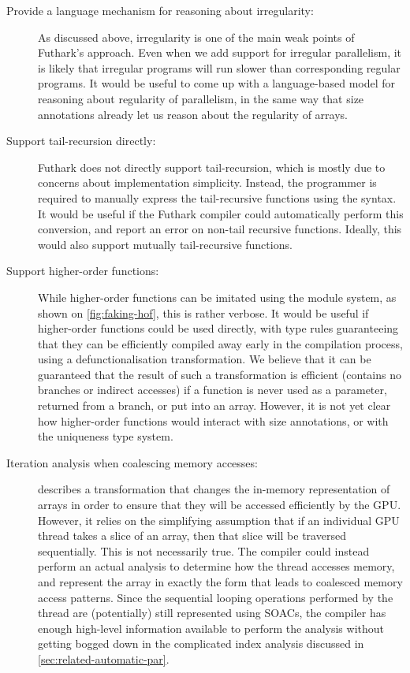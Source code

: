 \begin{description}
\item[Provide a language mechanism for reasoning about irregularity:]
  As discussed above, irregularity is one of the main weak points of
  Futhark's approach.  Even when we add support for irregular
  parallelism, it is likely that irregular programs will run slower
  than corresponding regular programs.  It would be useful to come up
  with a language-based model for reasoning about regularity of
  parallelism, in the same way that size annotations already let us
  reason about the regularity of arrays.

\item[Support tail-recursion directly:] Futhark does not directly
  support tail-recursion, which is mostly due to concerns about
  implementation simplicity.  Instead, the programmer is required to
  manually express the tail-recursive functions using the 
  syntax.  It would be useful if the Futhark compiler could
  automatically perform this conversion, and report an error on
  non-tail recursive functions.  Ideally, this would also support
  mutually tail-recursive functions.

\item[Support higher-order functions:] While higher-order functions
  can be imitated using the module system, as shown on
  \cref{fig:faking-hof}, this is rather verbose.  It would be useful
  if higher-order functions could be used directly, with type rules
  guaranteeing that they can be efficiently compiled away early in the
  compilation process, using a defunctionalisation transformation.  We
  believe that it can be guaranteed that the result of such a
  transformation is efficient (contains no branches or indirect
  accesses) if a function is never used as a  parameter,
  returned from a branch, or put into an array.  However, it is not
  yet clear how higher-order functions would interact with size
  annotations, or with the uniqueness type system.

\item[Iteration analysis when coalescing memory accesses:]
   describes a transformation that
  changes the in-memory representation of arrays in order to ensure
  that they will be accessed efficiently by the GPU.  However, it
  relies on the simplifying assumption that if an individual GPU
  thread takes a slice of an array, then that slice will be traversed
  sequentially.  This is not necessarily true.  The compiler could
  instead perform an actual analysis to determine how the thread
  accesses memory, and represent the array in exactly the form that
  leads to coalesced memory access patterns.  Since the sequential
  looping operations performed by the thread are (potentially) still
  represented using SOACs, the compiler has enough high-level
  information available to perform the analysis without getting bogged
  down in the complicated index analysis discussed in
  \cref{sec:related-automatic-par}.


\end{description}
